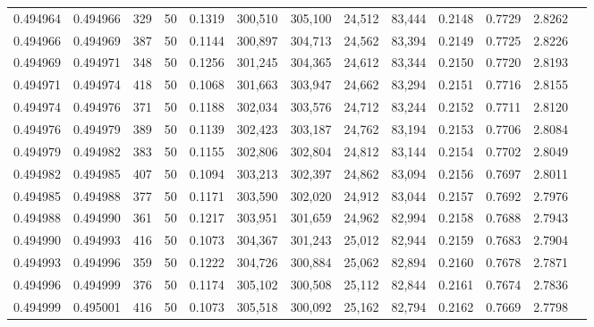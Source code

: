 \begin{tabular}{rrrrrrrrrrrrr}
0.494964 & 0.494966 &   329 &  50 &                                     0.1319 & 300,510 & 305,100 &  24,512 &  83,444 & 0.2148 & 0.7729 & 2.8262 \\
0.494966 & 0.494969 &   387 &  50 &                                     0.1144 & 300,897 & 304,713 &  24,562 &  83,394 & 0.2149 & 0.7725 & 2.8226 \\
0.494969 & 0.494971 &   348 &  50 &                                     0.1256 & 301,245 & 304,365 &  24,612 &  83,344 & 0.2150 & 0.7720 & 2.8193 \\
0.494971 & 0.494974 &   418 &  50 &                                     0.1068 & 301,663 & 303,947 &  24,662 &  83,294 & 0.2151 & 0.7716 & 2.8155 \\
0.494974 & 0.494976 &   371 &  50 &                                     0.1188 & 302,034 & 303,576 &  24,712 &  83,244 & 0.2152 & 0.7711 & 2.8120 \\
0.494976 & 0.494979 &   389 &  50 &                                     0.1139 & 302,423 & 303,187 &  24,762 &  83,194 & 0.2153 & 0.7706 & 2.8084 \\
0.494979 & 0.494982 &   383 &  50 &                                     0.1155 & 302,806 & 302,804 &  24,812 &  83,144 & 0.2154 & 0.7702 & 2.8049 \\
0.494982 & 0.494985 &   407 &  50 &                                     0.1094 & 303,213 & 302,397 &  24,862 &  83,094 & 0.2156 & 0.7697 & 2.8011 \\
0.494985 & 0.494988 &   377 &  50 &                                     0.1171 & 303,590 & 302,020 &  24,912 &  83,044 & 0.2157 & 0.7692 & 2.7976 \\
0.494988 & 0.494990 &   361 &  50 &                                     0.1217 & 303,951 & 301,659 &  24,962 &  82,994 & 0.2158 & 0.7688 & 2.7943 \\
0.494990 & 0.494993 &   416 &  50 &                                     0.1073 & 304,367 & 301,243 &  25,012 &  82,944 & 0.2159 & 0.7683 & 2.7904 \\
0.494993 & 0.494996 &   359 &  50 &                                     0.1222 & 304,726 & 300,884 &  25,062 &  82,894 & 0.2160 & 0.7678 & 2.7871 \\
0.494996 & 0.494999 &   376 &  50 &                                     0.1174 & 305,102 & 300,508 &  25,112 &  82,844 & 0.2161 & 0.7674 & 2.7836 \\
0.494999 & 0.495001 &   416 &  50 &                                     0.1073 & 305,518 & 300,092 &  25,162 &  82,794 & 0.2162 & 0.7669 & 2.7798 \\

\end{tabular}
